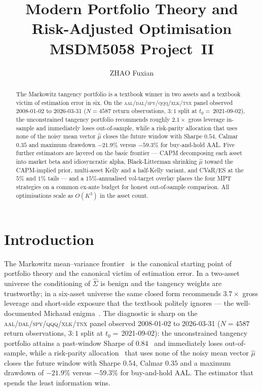 \documentclass[runningheads]{llncs}
\title{Modern Portfolio Theory and\\
Risk-Adjusted Optimisation\\
\vspace{0.4em}
\large MSDM5058 Project~II}
\author{ZHAO Fuxian}
\institute{HKUST -- Information Science MSc Programme\\
MSDM5058 Information Science -- Spring 2026}
\begin{document}
\maketitle
\thispagestyle{empty}
\newpage

\begin{abstract}
The Markowitz tangency portfolio is a textbook winner in two assets
and a textbook victim of estimation error in six. On the
\textsc{aal}/\textsc{dal}/\textsc{spy}/\textsc{qqq}/\textsc{xlk}/\textsc{tnx}
panel observed 2008-01-02 to 2026-03-31 ($N{=}\num{4587}$ return
observations, $3{:}1$ split at $t_{0}{=}\,$2021-09-02), the unconstrained
tangency portfolio recommends roughly $2.1\!\times$ gross leverage in-sample
and immediately loses out-of-sample, while a risk-parity allocation
that uses none of the noisy mean vector $\hat\mu$ closes the future
window with Sharpe $\num{0.54}$, Calmar $\num{0.35}$ and maximum
drawdown $-21.9\%$ versus $-59.3\%$ for buy-and-hold AAL. Five
further estimators are layered on the basic frontier --- CAPM
decomposing each asset into market beta and idiosyncratic alpha,
Black-Litterman shrinking $\hat\mu$ toward the CAPM-implied prior,
multi-asset Kelly and a half-Kelly variant, and CVaR/ES at the $5\%$
and $1\%$ tails --- and a $15\%$-annualised vol-target overlay places
the four MPT strategies on a common ex-ante budget for honest
out-of-sample comparison. All optimisations scale as $O(K^{3})$ in
the asset count.
\end{abstract}
\newpage

\tableofcontents
\newpage

\section{Introduction}\label{sec:intro}
The Markowitz mean--variance frontier~\cite{markowitz1952} is the
canonical starting point of portfolio theory and the canonical victim
of estimation error. In a two-asset universe the conditioning of
$\hat\Sigma$ is benign and the tangency weights are trustworthy; in a
six-asset universe the same closed form recommends $3.7\!\times$
gross leverage and short-side exposure that the textbook politely
ignores --- the well-documented Michaud
enigma~\cite{michaud1989}. The diagnostic is sharp on the
\textsc{aal}/\textsc{dal}/\textsc{spy}/\textsc{qqq}/\textsc{xlk}/\textsc{tnx}
panel observed 2008-01-02 to 2026-03-31 ($N{=}\num{4587}$ return
observations, $3{:}1$ split at $t_0{=}\,$2021-09-02): the unconstrained
tangency portfolio attains a past-window Sharpe of
$\num{0.84}$~\cite{sharpe1966} and immediately loses out-of-sample,
while a risk-parity allocation~\cite{maillard2010} that uses none of
the noisy mean vector $\hat\mu$ closes the future window with Sharpe
$\num{0.54}$, Calmar $\num{0.35}$ and a maximum drawdown of
$-21.9\%$ versus $-59.3\%$ for buy-and-hold AAL. The estimator that
spends the least information wins.
\end{document}
